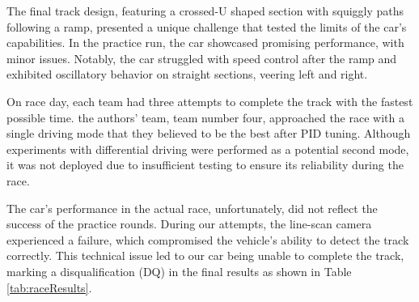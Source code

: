 \documentclass[conference]{IEEEtran}
\begin{document}
The final track design, featuring a crossed-U shaped section with squiggly paths following a ramp, presented a unique challenge that tested the limits of the car's capabilities. In the practice run, the car showcased promising performance, with minor issues. Notably, the car struggled with speed control after the ramp and exhibited oscillatory behavior on straight sections, veering left and right.

On race day, each team had three attempts to complete the track with the fastest possible time. the authors' team, team number four, approached the race with a single driving mode that they believed to be the best after PID tuning. Although experiments with differential driving were performed as a potential second mode, it was not deployed due to insufficient testing to ensure its reliability during the race.

The car's performance in the actual race, unfortunately, did not reflect the success of the practice rounds. During our attempts, the line-scan camera experienced a failure, which compromised the vehicle's ability to detect the track correctly. This technical issue led to our car being unable to complete the track, marking a disqualification (DQ) in the final results as shown in Table \ref{tab:raceResults}.
\end{document}
